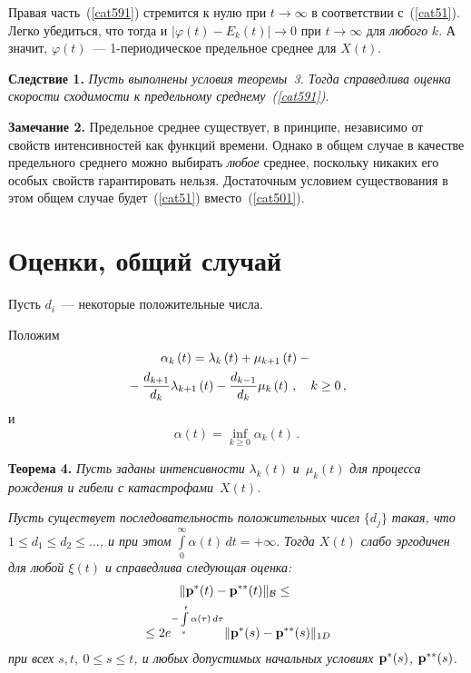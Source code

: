 \begin{multicols}{2}
Правая часть~(\ref{cat591}) стремится к нулю при  $t \to
\infty$ в соответствии с~(\ref{cat51}). Легко убедиться, что тогда и  $|\varphi
(t) - E_k(t)| \to 0$ при $t \to \infty$ для {\it любого} $k$. А значит,
$\varphi (t)$~--- 1-периодическое предельное среднее для $X(t)$.

\bigskip

\noindent
\textbf{Следствие 1.}
{\it Пусть выполнены условия теоремы~3. Тогда справедлива
оценка скорости сходимости к предельному среднему~(\ref{cat591})}.

\smallskip

\noindent
\textbf{Замечание 2.}
Предельное среднее существует, в принципе, независимо от свойств интенсивностей как функций времени.
Однако в общем случае в качестве предельного среднего можно выбирать
{\it любое} среднее, поскольку никаких его особых свойств
гарантировать нельзя. Достаточным условием существования в этом
общем случае будет~(\ref{cat51}) вмес\-то~(\ref{cat501}).

\section{Оценки, общий случай}

Пусть $d_i$~--- некоторые положительные числа.

Положим
\begin{multline}
\alpha_{k}\left( t\right) = \lambda _k\left( t\right) +\mu
_{k+1}\left( t\right) -{}\\
{}-\displaystyle\frac{\displaystyle d_{k+1}\mathstrut}{\displaystyle d_k\mathstrut} \lambda _{k+1}\left(
t\right) -\displaystyle\frac{\displaystyle d_{k-1}\mathstrut}{\displaystyle d_k\mathstrut} \mu _k\left( t\right)\,, \quad k \ge 0\,,
\label{g01}
\end{multline}
и
\begin{equation*}
\alpha\left( t\right) = \inf_{k\geq 0} \alpha_{k}\left( t\right)\,.
\end{equation*}

\smallskip

\noindent
\textbf{Теорема 4.}
\textit{Пусть заданы интенсивности}  $\lambda_k(t)$ \textit{и}~$\mu_k(t)$ 
\textit{для процесса рождения и гибели с катастрофа\-ми}~$X(t)$.
 
\textit{Пусть существует последовательность положительных чисел}  $\{d_j\}$
\textit{такая, что} $1 \le d_1 \le d_2 \le \dots$\textit{, и при этом}
$ %
\int\limits_0^\infty \alpha(t)\, dt = + \infty$. 
\textit{Тогда  $X(t)$ слабо эргодичен для любой $\xi(t)$ и
справедлива следующая оценка:}
\begin{multline*}
\|{\bf p^*}(t) - {\bf p^{**}}(t)\|_{\cal B}  \le{}\\
{}\le
 2 e^{-\int\limits_s^t \alpha(\tau)\, d\tau}\|{\bf p^*}(s) - {\bf
p^{**}}(s)\|_{1D} 
\end{multline*}
\textit{при всех $s,t, \ 0 \le s \le t$, и любых допустимых
начальных условиях ${\bf p^*}(s)$,  ${\bf p^{**}}(s)$}.



\end{multicols}

